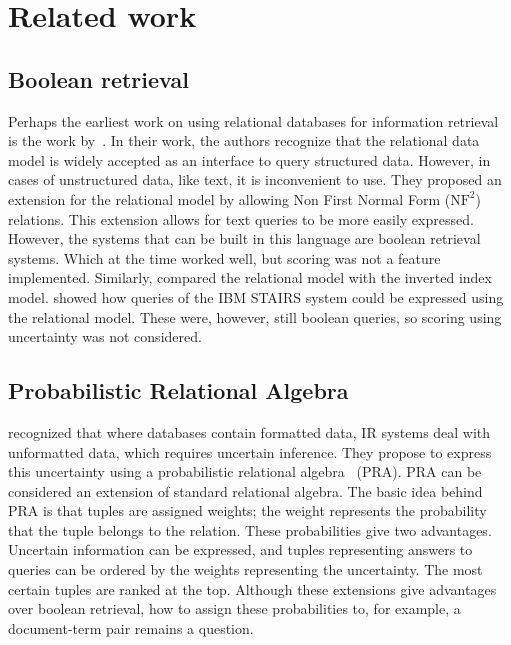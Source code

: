 \section{Related work}

\subsection{Boolean retrieval}
Perhaps the earliest work on using relational databases for information retrieval is the work by~\citet{SchekPistor}. In their work, the authors recognize that the relational data model is widely accepted as an interface to query structured data. However, in cases of unstructured data, like text, it is inconvenient to use. They proposed an extension for the relational model by allowing Non First Normal Form ($\text{NF}^2$) relations. This extension allows for text queries to be more easily expressed. However, the systems that can be built in this language are boolean retrieval systems. Which at the time worked well, but scoring was not a feature implemented.  
Similarly, \citet{macleod} compared the relational model with the inverted index model.  showed how queries of the IBM STAIRS system could be expressed using the relational model. These were, however, still boolean queries, so scoring using uncertainty was not considered. 

\subsection{Probabilistic Relational Algebra}
 recognized that where databases contain formatted data, IR systems deal with unformatted data, which requires uncertain inference. They propose to express this uncertainty using a probabilistic relational algebra~\citep{fuhr-pra} (PRA). 
PRA can be considered an extension of standard relational algebra. 
The basic idea behind PRA is that tuples are assigned weights; the weight represents the probability that the tuple belongs to the relation. These probabilities give two advantages. Uncertain information can be expressed, and tuples representing answers to queries can be ordered by the weights representing the uncertainty. The most certain tuples are ranked at the top. Although these extensions give advantages over boolean retrieval, how to assign these probabilities to, for example, a document-term pair remains a question.

